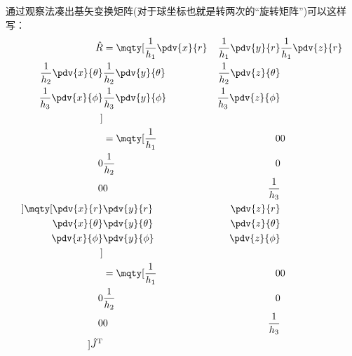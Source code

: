 通过观察法凑出基矢变换矩阵(对于球坐标也就是转两次的“旋转矩阵”)可以这样写：
\begin{equation}
    \label{eq:基矢变换矩阵}
  \begin{aligned}
    \RR &=
  \mqty[
  \frac{1}{h_1} \pdv{x}{r} &
  \frac{1}{h_1} \pdv{y}{r} &
  \frac{1}{h_1} \pdv{z}{r} \\
  \frac{1}{h_2} \pdv{x}{\theta} &
  \frac{1}{h_2} \pdv{y}{\theta} &
  \frac{1}{h_2} \pdv{z}{\theta} \\
  \frac{1}{h_3} \pdv{x}{\phi} &
  \frac{1}{h_3} \pdv{y}{\phi} &
  \frac{1}{h_3} \pdv{z}{\phi} \\] \\
        &=
        \mqty[
  \frac{1}{h_1}  &
  0  &
  0  \\
  0  &
  \frac{1}{h_2}  &
  0  \\
  0  &
  0  &
  \frac{1}{h_3}  \\
        ]
\mqty[
  \pdv{x}{r} &
  \pdv{y}{r} &
  \pdv{z}{r} \\
  \pdv{x}{\theta} &
  \pdv{y}{\theta} &
  \pdv{z}{\theta} \\
  \pdv{x}{\phi} &
  \pdv{y}{\phi} &
  \pdv{z}{\phi} \\] \\
                & = 
        \mqty[
  \frac{1}{h_1}  &
  0  &
  0  \\
  0  &
  \frac{1}{h_2}  &
  0  \\
  0  &
  0  &
  \frac{1}{h_3}  \\
        ]
        \JJ \tp
  \end{aligned}
\end{equation}


\vspace{1cm}
